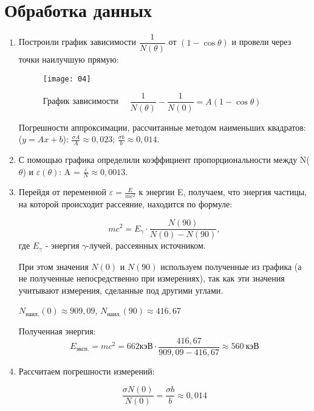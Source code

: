 \documentclass[letterpaper,12pt]{article}
\begin{document}
		\section{Обработка данных}
				\begin{enumerate}
			\item Построили график зависимости $\dfrac{1}{N(\theta)}$ от $(1-\cos\theta)$ и провели через точки наилучшую прямую:
			
			\begin{figure} [H]
				\centering
			{\texttt{[image: 04]}}
				\caption{График зависимости  ~~$\dfrac{1}{N(\theta)}-\dfrac{1}{N(0)}= A(1-\cos\theta)$ }
			\end{figure}
			
			Погрешности аппроксимации, рассчитанные методом наименьших квадратов: ($y=Ax+b$): $\frac{\sigma A}{A} \approx 0,023$; $\frac{\sigma b}{b} \approx 0,014$.
			
			\item С помощью графика определили коэффициент пропорциональности между N($\theta$) и $\varepsilon(\theta)$: A = $\frac{\varepsilon}{N}\approx0,0013$.
			
			
			\item Перейдя от переменной $\varepsilon=\frac{E}{mc^2}$ к энергии E, получаем, что энергия частицы, на которой происходит рассеяние, находится по формуле:
			
			\begin{equation}
			mc^2=E_\gamma\cdot\dfrac{N(90)}{N(0)-N(90)}, 
			\end{equation}
			где $E_\gamma$ - энергия $\gamma$-лучей, рассеянных источником.
			
			При этом значения  $ N(0)$ и $N(90) $ используем полученные из графика (а не полученные непосредственно при измерениях), так как эти значения учитывают измерения, сделанные под другими углами.
			
			$N_\text{наил.}(0)\approx909,09$,
			$N_\text{наил.}(90)\approx416,67$
			
			Полученная энергия:
			\begin{equation*}
			E_{\text{эксп.}}=mc^2=662\text{кэВ}\cdot\frac{416,67}{909,09-416,67}\approx560 ~ \text{кэВ}
			\end{equation*}
			
			\item Рассчитаем погрешности измерений:
			
		\begin{equation*}
		\dfrac{\sigma N(0)}{N(0)}=\dfrac{\sigma b}{b}\approx0,014
		\end{equation*}
			

\end{enumerate}
\end{document}
